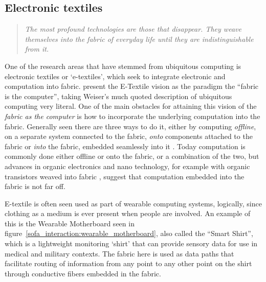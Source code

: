 \subsection{Electronic textiles}
\label{ch:textiletouch:related:etextiles}
\begin{quotation}
\emph{The most profound technologies are those that disappear. They weave themselves into the fabric of everyday life until they are indistinguishable from it. \citep{weiser1991computer}}
\end{quotation}
One of the research areas that have stemmed from ubiquitous computing is electronic textiles or `e-textiles', which seek to integrate electronic and computation into fabric.
\citet{park2002wearable} present the E-Textile vision as the paradigm the ``fabric is the computer'', taking Weiser's much quoted description of ubiquitous computing very literal.
One of the main obstacles for attaining this vision of the \emph{fabric as the computer} is how to incorporate the underlying computation into the fabric.
Generally seen there are three ways to do it, either by computing \emph{offline}, on a separate system connected to the fabric, \emph{onto} components attached to the fabric or \emph{into} the fabric, embedded seamlessly into it \citep{marculescu2003}.
Today computation is commonly done either offline or onto the fabric, or a combination of the two, but advances in organic electronics and nano technology, for example with organic transistors weaved into fabric \citep{lee2005weave}, suggest that computation embedded into the fabric is not far off.

E-textile is often seen used as part of wearable computing systems, logically, since clothing as a medium is ever present when people are involved.
An example of this is the Wearable Motherboard \citep{gopalsamy1999wearable} seen in figure~\ref{sofa_interaction:wearable_motherboard}, also called the ``Smart Shirt'', which is a lightweight monitoring `shirt' that can provide sensory data for use in medical and military contexts.
The fabric here is used as data paths that facilitate routing of information from any point to any other point on the shirt through conductive fibers embedded in the fabric.


